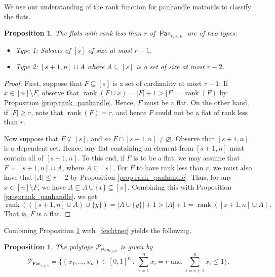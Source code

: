 \documentclass[11pt]{amsart}
\newtheorem{proposition}[theorem]{Proposition}
\theoremstyle{definition}
\renewcommand{\emptyset}{\varnothing}
\newcommand{\0}{\emptyset}
\newcommand{\Po}{\mathcal{P}}
\newcommand{\sm}{\setminus}
\DeclareMathOperator{\Pan}{\mathsf{Pan}} %
\DeclareMathOperator{\rank}{\operatorname{rank}}
\begin{document}
We use our understanding of the rank function for panhandle matroids to classify the flats.
\begin{proposition}\label{prop:flats_for_panhandle}
The flats with rank less than $r$ of $\Pan_{r,s,n}$ are of two types:
\begin{itemize}
    \item {Type 1:} Subsets of $[s]$ of size at most $r-1$.
    \item {Type 2:} $[s+1,n]\cup A$ where $A\subseteq [s]$ is a set of size at most $r-2$.
\end{itemize}
\end{proposition}
\begin{proof}

First, suppose that $F\subseteq [s]$ is a set of cardinality at most $r-1$.
If $x\in [n]\sm F$, observe that $\rank(F\cup x)=|F|+1>|F|=\rank(F)$ by Proposition \ref{prop:rank_panhandle}.
Hence, $F$ must be a flat.
On the other hand, if $|F|\geq r$, note that $\rank(F)=r$, and hence $F$ could not be a flat of rank less than $r$.

Now suppose that $F\nsubseteq [s]$, and so $F\cap [s+1,n]\neq \emptyset$.
Observe that $[s+1,n]$ is a dependent set.
Hence, any flat containing an element from $[s+1,n]$ must contain all of $[s+1,n]$.
To this end, if $F$ is to be a flat, we may assume that $F=[s+1,n]\cup A$, where $A \subseteq [s]$.
For $F$ to have rank less than $r$, we must also have that $|A|\leq r-2$ by Proposition \ref{prop:rank_panhandle}.
Thus, for any $x\in [n]\sm F$, we have $A\subsetneq A\cup \{x\}\subseteq [s]$.
Combining this with Proposition \ref{prop:rank_panhandle}, we get \[\rank(([s+1,n]\cup A)\cup\{y\})= |A\cup \{y\}|+1>|A|+1= \rank([s+1,n]\cup A).\]
That is, $F$ is a flat.
\end{proof}

Combining Proposition \ref{prop:flats_for_panhandle} with~\eqref{feichtner} yields the following.

\begin{proposition}\label{Pan-characterization}
The polytope $\Po_{\Pan_{r,s,n}}$ is given by
\[
\Po_{\Pan_{r,s,n}}=\{(x_1,\dots, x_n)\in [0,1]^n\ :\ \sum_{i=1}^nx_i=r \textrm{ and } \sum_{i=s+1}^n x_i \leq 1\}.
\]
\end{proposition}
\end{document}
